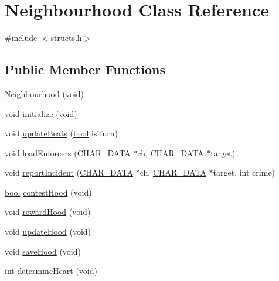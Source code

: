\hypertarget{classNeighbourhood}{\section{Neighbourhood Class Reference}
\label{classNeighbourhood}
}


{\ttfamily \#include $<$structs.\-h$>$}

\subsection*{Public Member Functions}
\begin{DoxyCompactItemize}
\item 
\hyperlink{classNeighbourhood_aabf34537b600d0c13cdb7e1ff945095f}{Neighbourhood} (void)
\item 
void \hyperlink{classNeighbourhood_aeb02b940fc9cc8b8442a0bb95e642737}{initialize} (void)
\item 
void \hyperlink{classNeighbourhood_a3adaa96435a3f09910a2473fce4d3f63}{update\-Beats} (\hyperlink{structs_8h_ad5c9d4ba3dc37783a528b0925dc981a0}{bool} is\-Turn)
\item 
void \hyperlink{classNeighbourhood_abe038eeabeb3649d5b44e794f26934a2}{load\-Enforcers} (\hyperlink{structs_8h_af33ed1e66e8541a08bed257124f50f31}{C\-H\-A\-R\-\_\-\-D\-A\-T\-A} $\ast$ch, \hyperlink{structs_8h_af33ed1e66e8541a08bed257124f50f31}{C\-H\-A\-R\-\_\-\-D\-A\-T\-A} $\ast$target)
\item 
void \hyperlink{classNeighbourhood_ac84c9a3b8aa2b12737bbc38c5133fabf}{report\-Incident} (\hyperlink{structs_8h_af33ed1e66e8541a08bed257124f50f31}{C\-H\-A\-R\-\_\-\-D\-A\-T\-A} $\ast$ch, \hyperlink{structs_8h_af33ed1e66e8541a08bed257124f50f31}{C\-H\-A\-R\-\_\-\-D\-A\-T\-A} $\ast$target, int crime)
\item 
\hyperlink{structs_8h_ad5c9d4ba3dc37783a528b0925dc981a0}{bool} \hyperlink{classNeighbourhood_ada6d36dd1065108114d9fd6dedd361f5}{contest\-Hood} (void)
\item 
void \hyperlink{classNeighbourhood_a9752e1b2ba0291e6d12e764f9097b4f7}{reward\-Hood} (void)
\item 
void \hyperlink{classNeighbourhood_a6e0f4674d7a3017c17e43b50372a8a4b}{update\-Hood} (void)
\item 
void \hyperlink{classNeighbourhood_a399aae8e5b17b27b0d39502a7beae6a5}{save\-Hood} (void)
\item 
int \hyperlink{classNeighbourhood_a7559d6a8784f5026c21f7ab7077b7cde}{determine\-Heart} (void)
\end{DoxyCompactItemize}
